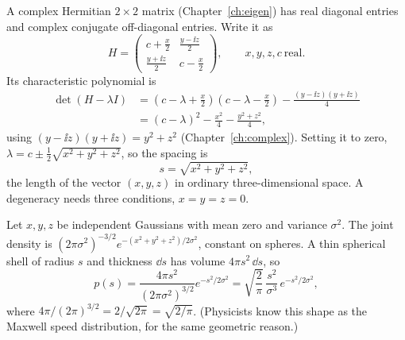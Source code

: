 A complex Hermitian $2\times2$ matrix (Chapter~\ref{ch:eigen}) has real diagonal entries and complex conjugate off-diagonal entries. Write it as
\begin{equation}
H=\begin{pmatrix} c+\tfrac x2 & \tfrac{y-\ii z}{2}\\[2pt] \tfrac{y+\ii z}{2} & c-\tfrac x2\end{pmatrix},\qquad x,y,z,c\ \text{real}.
\label{eq:level-statistics-paramC}
\end{equation}
Its characteristic polynomial is
\begin{align}
\det(H-\lambda I)&=\left(c-\lambda+\tfrac x2\right)\left(c-\lambda-\tfrac x2\right)-\frac{(y-\ii z)(y+\ii z)}{4}\nonumber\\
&=(c-\lambda)^2-\frac{x^2}{4}-\frac{y^2+z^2}{4},
\end{align}
using $(y-\ii z)(y+\ii z)=y^2+z^2$ (Chapter~\ref{ch:complex}). Setting it to zero, $\lambda=c\pm\tfrac12\sqrt{x^2+y^2+z^2}$, so the spacing is
\begin{equation}
s=\sqrt{x^2+y^2+z^2},
\end{equation}
the length of the vector $(x,y,z)$ in ordinary three-dimensional space. A degeneracy needs three conditions, $x=y=z=0$.

Let $x,y,z$ be independent Gaussians with mean zero and variance $\sigma^2$. The joint density is $(2\pi\sigma^2)^{-3/2}e^{-(x^2+y^2+z^2)/2\sigma^2}$, constant on spheres. A thin spherical shell of radius $s$ and thickness $\dd s$ has volume $4\pi s^2\,\dd s$, so
\begin{equation}
p(s)=\frac{4\pi s^2}{(2\pi\sigma^2)^{3/2}}e^{-s^2/2\sigma^2}=\sqrt{\frac{2}{\pi}}\,\frac{s^2}{\sigma^3}\,e^{-s^2/2\sigma^2},
\label{eq:level-statistics-maxwell}
\end{equation}
where $4\pi/(2\pi)^{3/2}=2/\sqrt{2\pi}=\sqrt{2/\pi}$. (Physicists know this shape as the Maxwell speed distribution, for the same geometric reason.)

